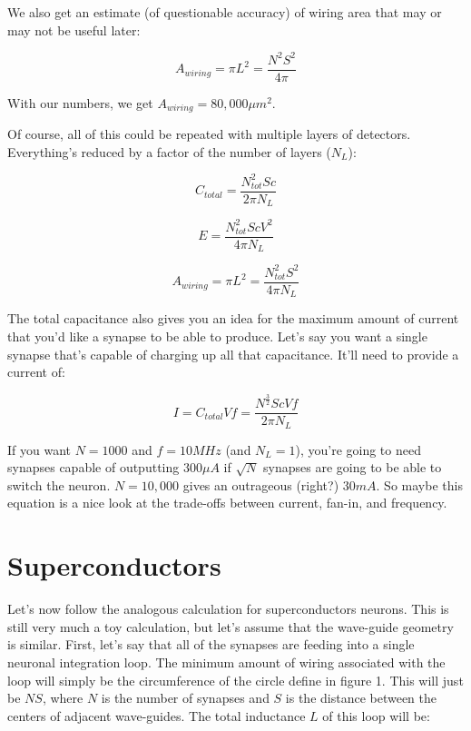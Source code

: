 \documentclass[twocolumn]{article}
\begin{document}
We also get an estimate (of questionable accuracy) of wiring area that may or may not be useful later:

\begin{equation}
    A_{wiring} = \pi L^2 = \frac{N^2 S^2}{4\pi}
\end{equation}

With our numbers, we get $A_{wiring} = 80,000 \mu m^2$. 

Of course, all of this could be repeated with multiple layers of detectors. Everything's reduced by a factor of the number of layers ($N_L$):

\begin{equation}
    C_{total} = \frac{N_{tot}^{2}Sc}{2\pi N_L}
\end{equation}

\begin{equation}
    E = \frac{N_{tot}^{2}ScV^{2}}{4\pi N_L}
\end{equation}

\begin{equation}
    A_{wiring} = \pi L^2 = \frac{N_{tot}^2 S^2}{4\pi N_L}
\end{equation}

The total capacitance also gives you an idea for the maximum amount of current that you'd like a synapse to be able to produce. Let's say you want a single synapse that's capable of charging up all that capacitance. It'll need to provide a current of:

\begin{equation}
    I = C_{total}Vf = \frac{N^{\frac{3}{2}}ScVf}{2\pi N_L}
\end{equation}

If you want $N=1000$ and $f=10 MHz$ (and $N_L = 1$), you're going to need synapses capable of outputting $300 \mu A$ if $\sqrt{N}$ synapses are going to be able to switch the neuron. $N=10,000$ gives an outrageous (right?) $30 mA$. So maybe this equation is a nice look at the trade-offs between current, fan-in, and frequency.

\section{Superconductors}
Let's now follow the analogous calculation for superconductors neurons. This is still very much a toy calculation, but let's assume that the wave-guide geometry is similar. First, let's say that all of the synapses are feeding into a single neuronal integration loop. The minimum amount of wiring associated with the loop will simply be the circumference of the circle define in figure 1. This will just be $NS$, where $N$ is the number of synapses and $S$ is the distance between the centers of adjacent wave-guides. The total inductance $L$ of this loop will be:
\end{document}
